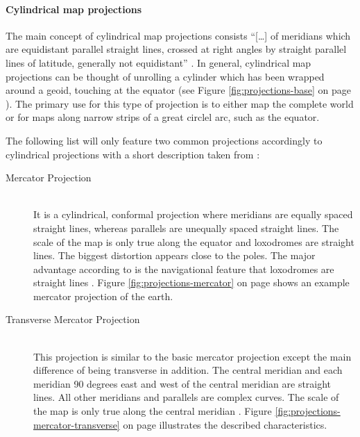 \paragraph{Cylindrical map projections}
The main concept of cylindrical map projections consists ``[\ldots] of meridians which are equidistant parallel straight lines, crossed at right angles by straight parallel lines of latitude, generally not equidistant'' .
In general, cylindrical map projections can be thought of unrolling a cylinder which has been wrapped around a geoid, touching at the equator (see Figure \ref{fig:projections-base} on page \pageref{fig:projections-base}).
The primary use for this type of projection is to either map the complete world or for maps along narrow strips of a great circlel arc, such as the equator.

The following list will only feature two common projections accordingly to cylindrical projections with a short description taken from \citeauthor{Snyder1987} :

\begin{description}

\item[Mercator Projection] \hfill \\
It is a cylindrical, conformal projection where meridians are equally spaced straight lines, whereas parallels are unequally spaced straight lines. The scale of the map is only true along the equator and loxodromes are straight lines. The biggest distortion appears close to the poles. The major advantage according to \citeauthor{Snyder1987} is the navigational feature that loxodromes are straight lines . Figure \ref{fig:projections-mercator} on page \pageref{fig:projections-mercator} shows an example mercator projection of the earth.


\item[Transverse Mercator Projection] \hfill \\
This projection is similar to the basic mercator projection except the main difference of being transverse in addition. The central meridian and each meridian 90 degrees east and west of the central meridian are straight lines. All other meridians and parallels are complex curves. The scale of the map is only true along the central meridian . Figure \ref{fig:projections-mercator-transverse} on page \pageref{fig:projections-mercator-transverse} illustrates the described characteristics.

\end{description}

